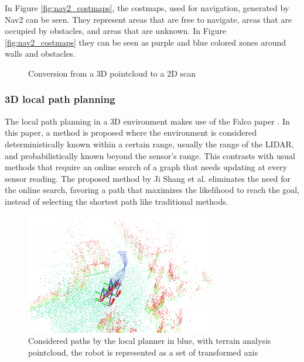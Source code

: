 \documentclass[12pt]{article}
\begin{document}
        In Figure \ref{fig:nav2_costmaps}, the costmaps, used for navigation, generated by Nav2 can be seen. They represent areas that are free to navigate, areas that are occupied by obstacles, and areas that are unknown. In Figure \ref{fig:nav2_costmaps} they can be seen as purple and blue colored zones around walls and obstacles.  

        \begin{figure}[h]
            \centering
            \resizebox{0.75\textwidth}{!}{%
            
            }   
            \caption{Conversion from a 3D pointcloud to a 2D scan}
            \label{fig:pointcloud_to_laserscan}
        \end{figure}
        
        
        \subsubsection{3D local path planning}
        \label{section:local_path_planning}

        The local path planning in a 3D environment makes use of the Falco paper \cite{zhang2020falco}. In this paper, a method is proposed where the environment is considered deterministically known within a certain range, usually the range of the LIDAR, and probabilistically known beyond the sensor's range. This contrasts with usual methods that require an online search of a graph that needs updating at every sensor reading. The proposed method by Ji Shang et al. eliminates the need for the online search, favoring a path that maximizes the likelihood to reach the goal, instead of selecting the shortest path like traditional methods.

        \begin{figure}[H]
            \centering
            \includegraphics[width=0.75\textwidth]{Images/free_paths.png}
            \caption{Considered paths by the local planner in blue, with terrain analysis pointcloud, the robot is represented as a set of transformed axis}
            \label{fig:local_planner_paths}
        \end{figure}
\end{document}
